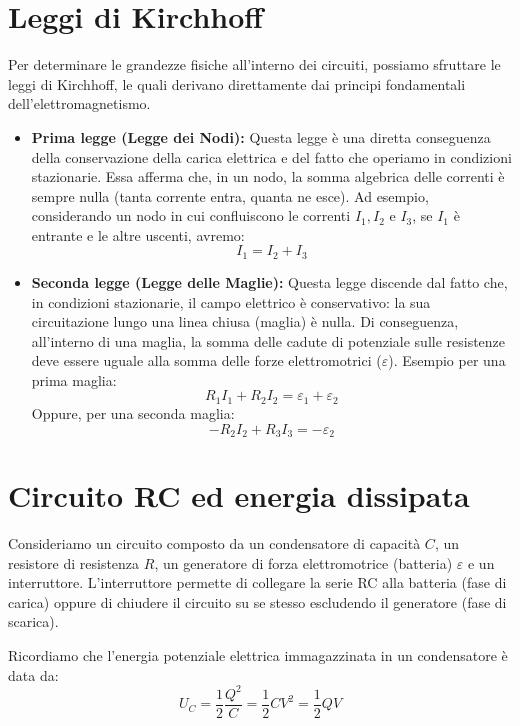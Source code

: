 \documentclass{book}
\begin{document}
\section{Leggi di Kirchhoff}
Per determinare le grandezze fisiche all'interno dei circuiti, possiamo sfruttare le leggi di Kirchhoff, le quali derivano direttamente dai principi fondamentali dell'elettromagnetismo.

\begin{itemize}
    \item \textbf{Prima legge (Legge dei Nodi):} Questa legge è una diretta conseguenza della conservazione della carica elettrica e del fatto che operiamo in condizioni stazionarie. Essa afferma che, in un nodo, la somma algebrica delle correnti è sempre nulla (tanta corrente entra, quanta ne esce).
    Ad esempio, considerando un nodo in cui confluiscono le correnti $I_1, I_2$ e $I_3$, se $I_1$ è entrante e le altre uscenti, avremo:
    $$
    I_1 = I_2+I_3
    $$

    \item \textbf{Seconda legge (Legge delle Maglie):} Questa legge discende dal fatto che, in condizioni stazionarie, il campo elettrico è conservativo: la sua circuitazione lungo una linea chiusa (maglia) è nulla. Di conseguenza, all'interno di una maglia, la somma delle cadute di potenziale sulle resistenze deve essere uguale alla somma delle forze elettromotrici ($\varepsilon$).
    Esempio per una prima maglia:
    $$
    R_1I_1+R_2I_2= \varepsilon_1+\varepsilon_2
    $$
    Oppure, per una seconda maglia:
    $$
    -R_2I_2+R_3I_3= -\varepsilon_2
    $$
\end{itemize}



\section{Circuito RC ed energia dissipata}

Consideriamo un circuito composto da un condensatore di capacità $C$, un resistore di resistenza $R$, un generatore di forza elettromotrice (batteria) $\varepsilon$ e un interruttore. L'interruttore permette di collegare la serie RC alla batteria (fase di carica) oppure di chiudere il circuito su se stesso escludendo il generatore (fase di scarica).

Ricordiamo che l'energia potenziale elettrica immagazzinata in un condensatore è data da:
$$
U_C = \frac{1}{2}\frac{Q^2}{C} = \frac{1}{2}CV^2 = \frac{1}{2}QV
$$
\end{document}
